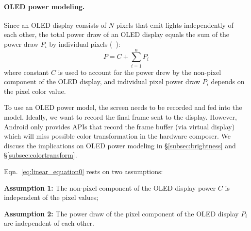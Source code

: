 \paragraph{OLED power modeling.}
Since an OLED display consists of $N$ pixels that emit lights
independently of each other, the total power draw of an OLED display
equals the sum of the power draw $P_i$ by individual pixels
(\eg~\cite{dong2009current,kim2013runtime}):
\begin{equation}
	P = C + \sum_{i=1}^{n}{P_i}
	\label{eq:linear_equation0}
\end{equation}
where constant $C$ is used to account for the 
power drew by
the non-pixel component of the OLED display,
and individual pixel power draw $P_i$ depends on
the pixel color value.

To use an OLED power model, the screen needs to be recorded and
fed into the model.  Ideally, we want to record the final frame 
sent to the display.  However, Android only provides APIs that record
the frame buffer (via virtual display)  which will miss possible
color transformation in the hardware composer.  We discuss the implications
on OLED power modeling in \S\ref{subsec:brightness} and
\S\ref{subsec:colortransform}.


Eqn.~\ref{eq:linear_equation0} rests on two assumptions:

\noindent
{\bf Assumption 1:} The non-pixel component of the OLED display power $C$ is independent
of the pixel values;

\noindent
{\bf Assumption 2:} The power draw of the pixel component of the OLED display $P_i$
are independent of each other.
\fi


